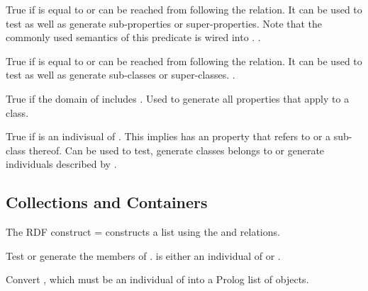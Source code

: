 \documentclass[11pt]{article}
\begin{document}
\begin{description}
True if  is equal to  or 
can be reached from  following the
 relation. It can be used to test as well as
generate sub-properties or super-properties. Note that the commonly used
semantics of this predicate is wired into .%
	.%

True if  is equal to  or 
can be reached from  following the
 relation. It can be used to test as
well as generate sub-classes or super-classes.%
	.

True if the domain of  includes .  Used to
generate all properties that apply to a class.

True if  is an indivisual of .  This implies
 has an  property that refers to
 or a sub-class thereof.  Can be used to test, generate
classes  belongs to or generate individuals described
by .
\end{description}

\subsection{Collections and Containers}

%
%
The RDF construct = constructs
a list using the  and  relations.

\begin{description}
Test or generate the members of .   is either an
individual of  or .

Convert , which must be an individual of  into
a Prolog list of objects.
\end{description}
\end{document}
